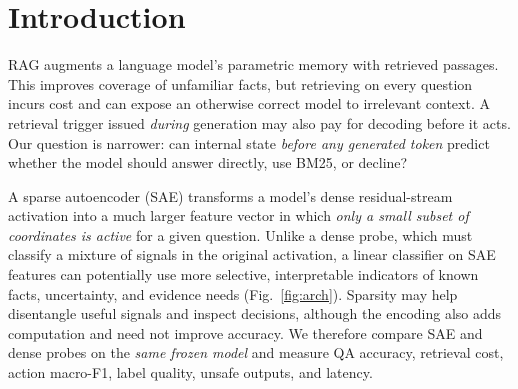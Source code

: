 \documentclass[11pt,a4paper,twocolumn]{article}
\begin{document}
\section{Introduction}
RAG augments a language model's parametric memory with retrieved passages. This improves coverage of unfamiliar facts, but retrieving on every question incurs cost and can expose an otherwise correct model to irrelevant context. A retrieval trigger issued \emph{during} generation may also pay for decoding before it acts. Our question is narrower: can internal state \emph{before any generated token} predict whether the model should answer directly, use BM25, or decline?

A sparse autoencoder (SAE) transforms a model's dense residual-stream activation into a much larger feature vector in which \emph{only a small subset of coordinates is active} for a given question. Unlike a dense probe, which must classify a mixture of signals in the original activation, a linear classifier on SAE features can potentially use more selective, interpretable indicators of known facts, uncertainty, and evidence needs (Fig.~\ref{fig:arch}). Sparsity may help disentangle useful signals and inspect decisions, although the encoding also adds computation and need not improve accuracy. We therefore compare SAE and dense probes on the \emph{same frozen model} and measure QA accuracy, retrieval cost, action macro-F1, label quality, unsafe outputs, and latency.
\end{document}
